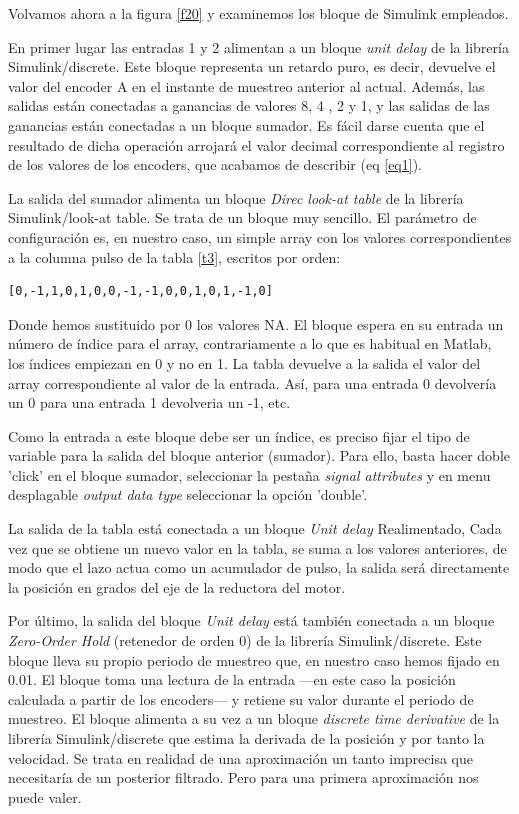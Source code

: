 \documentclass[10pt,a4paper]{report}
\begin{document}
Volvamos ahora a la figura \ref{f20} y examinemos los bloque de Simulink empleados.

En primer lugar las entradas 1 y 2 alimentan a un bloque \emph{unit delay} de la librería Simulink/discrete. Este bloque representa un retardo puro, es decir, devuelve el valor del encoder A en el instante de muestreo anterior al actual. Además, las salidas están conectadas a ganancias de valores 8, 4 , 2 y 1, y las salidas de las ganancias están conectadas a un bloque sumador. Es fácil darse cuenta que el resultado de dicha operación arrojará el valor decimal correspondiente al registro de los valores de los encoders, que acabamos de describir (eq \ref{eq1}).

La salida del sumador alimenta un bloque \emph{Direc look-at table} de la librería Simulink/look-at table. Se trata de un bloque muy sencillo. El parámetro de configuración es, en nuestro caso, un simple array con los valores correspondientes a la columna pulso de la tabla \ref{t3}, escritos por orden:
\begin{verbatim}
[0,-1,1,0,1,0,0,-1,-1,0,0,1,0,1,-1,0]
\end{verbatim}
Donde hemos sustituido por 0 los valores NA. El bloque espera  en su entrada un número de índice para el array, contrariamente a lo que es habitual en Matlab, los índices empiezan en 0 y  no en 1. La tabla devuelve a la salida el valor del array correspondiente al valor de la entrada. Así, para una entrada 0 devolvería un 0 para una entrada 1 devolveria un -1, etc.

Como la entrada a este bloque debe ser un índice, es preciso fijar el tipo de variable para la salida del bloque anterior (sumador). Para ello, basta hacer doble 'click' en el bloque sumador, seleccionar la pestaña \emph{signal attributes} y en menu desplagable \emph{output data type} seleccionar la opción 'double'. 

La salida de la tabla está conectada a un bloque \emph{Unit delay} Realimentado, Cada vez que se obtiene un nuevo valor en la tabla, se suma a los valores anteriores, de modo que el lazo actua como un acumulador de pulso, la salida será directamente la posición en grados del eje de la reductora del motor.

Por último, la salida del bloque \emph{Unit delay} está también conectada a un bloque \emph{Zero-Order Hold} (retenedor de orden 0) de la librería Simulink/discrete. Este bloque lleva su propio periodo de muestreo que, en nuestro caso hemos fijado en 0.01. El bloque toma una lectura de la entrada ---en este caso la posición calculada a partir de los encoders--- y retiene su valor durante el periodo de muestreo. El bloque alimenta a su vez a un bloque \emph{discrete time derivative} de la librería Simulink/discrete que estima la derivada de la posición y por tanto la velocidad. Se trata en realidad de una aproximación un tanto imprecisa que necesitaría de un posterior filtrado. Pero para una primera aproximación nos puede valer.
\end{document}
